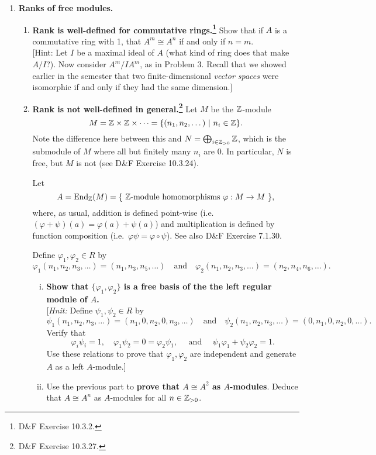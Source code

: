 \documentclass[11pt, reqno]{amsart}
\theoremstyle{plain}
\theoremstyle{definition}
\theoremstyle{example}
\def\End{\mathrm{End}}
\def\f{\varphi}
\begin{document}
\begin{enumerate}[1.]
\item  \textbf{Ranks of free modules.}
\begin{enumerate}
\item \textbf{Rank is well-defined for commutative rings.\footnote{D\&F Exercise 10.3.2.} } Show that if $A$ is a commutative ring with 1, that $A^m \cong A^n$ if and only if $n=m$.\\
{[Hint: Let $I$ be a maximal ideal of $A$ (what kind of ring does that make $A/I$?). Now consider $A^m/IA^m$, as in Problem 3. Recall that we showed earlier in the semester that two finite-dimensional \emph{vector spaces} were isomorphic if and only if they had the same dimension.]}
\item \textbf{Rank is not well-defined in general.\footnote{D\&F Exercise 10.3.27.} }
Let $M$ be the $\mathbb{Z}$-module  
$$M = \mathbb{Z} \times \mathbb{Z} \times \cdots 
	= \{(n_1, n_2, \dots ) ~|~ n_i \in \mathbb{Z}\}.$$
Note the difference here between this and  $N = \bigoplus_{i \in \mathbb{Z}_{>0}} \mathbb{Z}$, which is the submodule of $M$ where all but finitely many $n_i$ are 0. In particular, $N$ is free, but $M$ is not (see D\&F Exercise 10.3.24). 

Let 
$$A = \End_\ZZ(M) = \{ \text{ $\ZZ$-module homomorphisms $\f: M \to M$ }\},$$
where, as usual, addition is defined point-wise (i.e.\ $(\f + \psi)(a) = \f(a) + \psi(a)$) and multiplication is defined by function composition (i.e.\ $\f\psi = \f \circ \psi$). See also D\&F Exercise 7.1.30. 

Define $\f_1, \f_2 \in R$ by 
$$\f_1(n_1, n_2, n_3, \dots) = (n_1, n_3, n_5, \dots) \quad \text{and} \quad 
	\f_2(n_1, n_2, n_3, \dots) = (n_2, n_4, n_6, \dots).$$



\begin{enumerate}[(i)]
\item \textbf{Show that $\{\f_1, \f_2\}$ is a free basis of the the left regular module of $A$.}\\
{[\emph{Hnit:} Define $\psi_1, \psi_2 \in R$ by 
$$\psi_1(n_1, n_2, n_3, \dots) = (n_1, 0, n_2, 0, n_3, \dots) \quad \text{and} \quad 
	\psi_2(n_1, n_2, n_3, \dots) = (0, n_1, 0, n_2, 0, \dots).$$
Verify that 
$$\f_i \psi_i = 1, \quad \f_1 \psi_2 = 0 = \f_2 \psi_1, \quad \text{ and } \quad 
	\psi_1 \f_1 + \psi_2 \f_2 = 1.$$
	Use these relations to prove that $\f_1, \f_2$ are independent and generate $A$ as a left $A$-module.]}
\item Use the previous part to \textbf{prove that $A \cong A^2$ as $A$-modules}. Deduce that $A \cong A^n$ as $A$-modules for all $n \in \mathbb{Z}_{>0}$. 
\end{enumerate}


\end{enumerate}
\end{enumerate}
\end{document}
